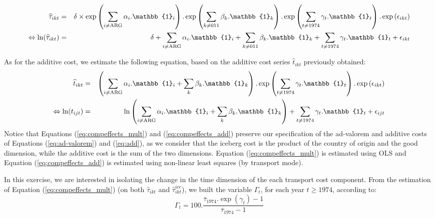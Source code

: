 \documentclass[a4paper,11pt]{article}
\begin{document}
\begin{eqnarray}
\widehat{\tau}_{ikt}&=&\delta\times \exp\left(\sum_{i \neq \text{ARG}}\alpha_i.\mathbb{1}_i\right).\exp\left(\sum_{k\neq \text{011}}\beta_k.\mathbb{1}_k\right).\exp\left(\sum_{t \neq 1974}\gamma_t.\mathbb{1}_t\right) .\exp\left(\epsilon_{ikt}\right) \notag \\
\Leftrightarrow \ln(\widehat{\tau}_{ikt})&=&\delta +\sum_{i \neq \text{ARG}}\alpha_i.\mathbb{1}_i + \sum_{k\neq \text{011}}\beta_k.\mathbb{1}_k + \sum_{t \neq 1974}\gamma_t.\mathbb{1}_t+\epsilon_{ikt} \label{eq:compeffects_mult}
\end{eqnarray}

As for the additive cost, we estimate the following equation, based on the additive cost series $\widehat{t}_{ikt}$ previously obtained:
\begin{eqnarray}
\widehat{t}_{ikt}&=&\left( \sum_{i \neq \text{ARG}}  \alpha_i.\mathbb{1}_i+\sum_{k}\beta_k.\mathbb{1}_k\right).\exp\left(\sum_{t \neq 1974}\gamma_t.\mathbb{1}_t\right) .\exp\left(\epsilon_{ikt}\right) \notag \\
\Leftrightarrow \ln(t_{ijt})&=&\ln\left( \sum_{i \neq \text{ARG}}  \alpha_i.\mathbb{1}_i+\sum_{k}\beta_k.\mathbb{1}_k\right) + \sum_{t \neq 1974}\gamma_t.\mathbb{1}_t+\epsilon_{ijt} \label{eq:compeffects_add}
\end{eqnarray}
Notice that Equations (\ref{eq:compeffects_mult}) and (\ref{eq:compeffects_add}) preserve our specification of the ad-valorem and additive costs of Equations (\ref{eq:ad-valorem}) and (\ref{eq:add}), as we consider that the iceberg cost is the product of the country of origin and the good dimension, while the additive cost is the sum of the two dimensions.
Equation (\ref{eq:compeffects_mult}) is estimated using OLS and Equation (\ref{eq:compeffects_add}) is estimated using non-linear least squares (by transport mode).

In this exercise, we are interested in isolating the change in the time dimension of the each transport cost component. From the estimation of Equation (\ref{eq:compeffects_mult}) (on both $\widehat{\tau}_{ikt}$ and $\widehat{\tau}_{ikt}^{ice}$), we built the variable $\Gamma_t$, for each year $t\geq 1974$, according to:
\begin{equation*}
\Gamma_t = 100.\frac {\bar{\tau}_{1974}.\exp(\gamma_t)-1} {\bar{\tau}_{1974}-1}
\end{equation*}
\end{document}

